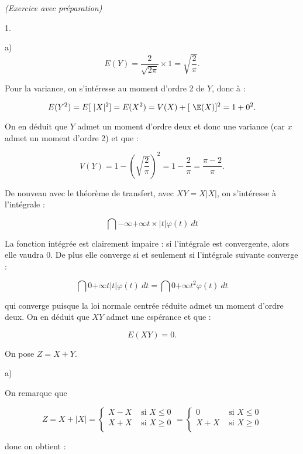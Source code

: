 \documentclass[11pt]{article}%
\begin{document}
\begin{exercice}{\it (Exercice avec préparation)}
\begin{noliste}{1.}
\begin{noliste}{a)}
\[
 E ( Y ) = \frac{ 2 }{ \sqrt{ 2 \pi } } \times 1 = \sqrt{ \frac{ 2 }{
\pi } }. 
\]

 Pour la variance, on s'intéresse au moment d'ordre 2 de $Y$, donc à : 
 
\[
 E ( Y^{2} ) = E [ \ \vert X |^{2} ] = E ( X^{2} ) = V (X) + [ \ \E(X)
]^{2} = 1 + 0^{2}. 
\]

 On en déduit que $Y$ admet un moment d'ordre deux et donc une variance
(car $x$ admet un moment d'ordre 2) et que : 
 
\[
 V ( Y ) = 1 - \left( \sqrt{ \frac{ 2 }{ \pi } } \right)^{2} = 1 -
\frac{ 2 }{ \pi } = \frac{ \pi - 2 }{ \pi }. 
\]

 \item De nouveau avec le théorème de transfert, avec $X Y = X | X |$,
on s'intéresse à l'intégrale :
 
\[
 \dint{-\infty}{+ \infty} t \times | t | \varphi (t) \ dt 
\]

 La fonction intégrée est clairement impaire : si l'intégrale est
convergente, alors elle vaudra 0. De plus elle converge si et seulement
si l'intégrale suivante converge :
 
\[
 \dint{0}{ + \infty } t | t | \varphi (t) \ dt = \dint{0}{+ \infty}
t^{2} \varphi (t) \ dt 
\]

 qui converge puisque la loi normale centrée réduite admet un moment
d'ordre deux. On en déduit que $X Y$ admet une espérance et que : 
 
\[
 E ( X Y ) = 0. 
\]

 \end{noliste}

 \item On pose $Z = X + Y$. \begin{noliste}{a)}
 \setlength{\itemsep}{2mm}

 \item On remarque que 
 
\[
 Z = X + | X | = \left\{\begin{array}{cl}
 X - X & \text{ si } X \leq 0 \\
X + X & \text{ si } X \geq 0 \\
\end{array}
\right. = \left\{\begin{array}{cl}
 0 & \text{ si } X \leq 0 \\
X + X & \text{ si } X \geq 0 \\
\end{array}
\right. 
\]

 donc on obtient : 
 

\end{noliste}
\end{noliste}
\end{exercice}
\end{document}
